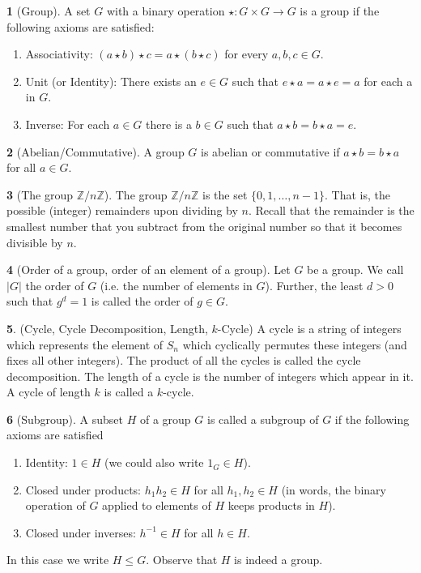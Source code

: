\documentclass[12pt]{article}
\theoremstyle{definition}
\newtheorem{definition}{\color{NavyBlue}{\textbf{Definition}}}
\begin{document}
\begin{definition}[Group]
A set $G$ with a binary operation $\star: G \times G \rightarrow G$ is a group if the following axioms are satisfied:
\begin{enumerate}
\item Associativity: $(a \star b) \star c = a \star (b \star c)$ for every $a,b,c \in G$.
\item Unit (or Identity): There exists an $e \in G$ such that $e \star a = a \star e = a$ for each a in $G$.
\item Inverse: For each $a \in G$ there is a $b \in G$ such that $a \star b = b \star a = e$.
\end{enumerate}
\end{definition}

\begin{definition}[Abelian/Commutative]
A group $G$ is abelian or commutative if $a \star b = b \star a$ for all $a \in G$.
\end{definition}

\begin{definition}[The group $\mathbb{Z} / n \mathbb{Z}$]
The group $\mathbb{Z} / n \mathbb{Z}$ is the set $\{0,1,\ldots,n-1\}$. That is, the possible (integer) remainders upon dividing by $n$. Recall that the remainder is the smallest number that you subtract from the original number so that it becomes divisible by $n$.
\end{definition}

\begin{definition}[Order of a group, order of an element of a group]
Let $G$ be a group. We call $|G|$ the order of $G$ (i.e. the number of elements in $G$). Further, the least $d >0$ such that $g^d = 1$ is called the order of $g \in G$.
\end{definition}

\begin{definition}(Cycle, Cycle Decomposition, Length, $k$-Cycle)
A cycle is a string of integers which represents the element of $S_n$ which cyclically permutes these integers (and fixes all other integers). The product of all the cycles is called the cycle decomposition. The length of a cycle is the number of integers which appear in it. A cycle of length $k$ is called a $k$-cycle.
\end{definition}

\begin{definition}[Subgroup]
A subset $H$ of a group $G$ is called a subgroup of $G$ if the following axioms are satisfied
\begin{enumerate}
\item Identity: $1 \in H$ (we could also write $1_G \in H$).
\item Closed under products: $h_1 h_2 \in H$ for all $h_1, h_2 \in H$ (in words, the binary operation of $G$ applied to elements of $H$ keeps products in $H$).
\item Closed under inverses: $h^{-1} \in H$ for all $h\in H$.
\end{enumerate}
In this case we write $H \leq G$. Observe that $H$ is indeed a group.
\end{definition}
\end{document}
